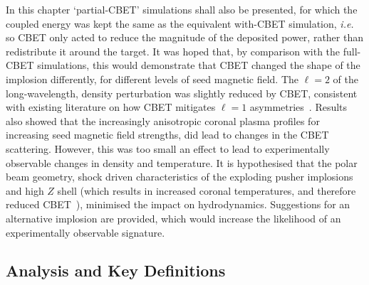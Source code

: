 In this chapter `partial-\ac{CBET}' simulations shall also be presented, for which the coupled energy was kept the same as the equivalent with-\ac{CBET} simulation, \textit{i.e.} so \ac{CBET} only acted to reduce the magnitude of the deposited power, rather than redistribute it around the target.
It was hoped that, by comparison with the full-\ac{CBET} simulations, this would demonstrate that \ac{CBET} changed the shape of the implosion differently, for different levels of seed magnetic field.
The $\ell=2$ of the long-wavelength, density perturbation was slightly reduced by \ac{CBET}, consistent with existing literature on how \ac{CBET} mitigates $\ell=1$ asymmetries~\cite{colaitis_inverse_2021}.
Results also showed that the increasingly anisotropic coronal plasma profiles for increasing seed magnetic field strengths, did lead to changes in the \ac{CBET} scattering.
However, this was too small an effect to lead to experimentally observable changes in density and temperature.
It is hypothesised that the polar beam geometry, shock driven characteristics of the exploding pusher implosions and high $Z$ shell (which results in increased coronal temperatures, and therefore reduced \ac{CBET}~\cite{colaitis_exploration_2023}), minimised the impact on hydrodynamics.
Suggestions for an alternative implosion are provided, which would increase the likelihood of an experimentally observable signature.

\subsection{Analysis and Key Definitions}%
\label{sec:Res2_analysis_definitions}

